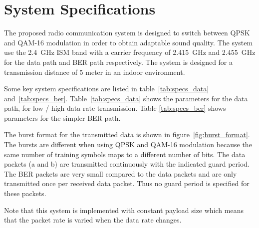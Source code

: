 \section{System Specifications}
\label{sec:specifications}
The proposed radio communication system is designed to switch between QPSK and QAM-16 modulation in order to obtain adaptable sound quality. The system use the \SI{2.4}{\giga\hertz} ISM band with a carrier frequency of \SI{2.415}{\giga\hertz} and \SI{2.455}{\giga\hertz} for the data path and BER path respectively. The system is designed for a transmission distance of 5 meter in an indoor environment. 

Some key system specifications are listed in table~\ref{tab:specs_data} and \ref{tab:specs_ber}. Table~\ref{tab:specs_data} shows the parameters for the data path, for low / high data rate transmission. Table \ref{tab:specs_ber} shows parameters for the simpler BER path. 


The burst format for the transmitted data is shown in figure~\ref{fig:burst_format}.
\newpage
 The bursts are different when using QPSK and QAM-16 modulation because the same number of training symbols maps to a different number of bits. The data packets (a and b) are transmitted continuously with the indicated guard period. The BER packets are very small compared to the data packets and are only transmitted once per received data packet. Thus no guard period is specified for these packets. 

Note that this system is implemented with constant payload size which means that the packet rate is varied when the data rate changes.

 